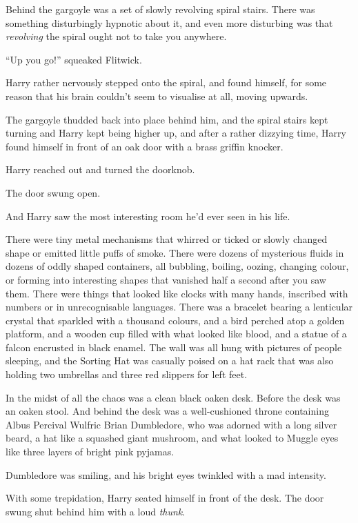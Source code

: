 Behind the gargoyle was a set of slowly revolving spiral stairs. There was something disturbingly hypnotic about it, and even more disturbing was that \emph{revolving} the spiral ought not to take you anywhere.

“Up you go!” squeaked Flitwick.

Harry rather nervously stepped onto the spiral, and found himself, for some reason that his brain couldn’t seem to visualise at all, moving upwards.

The gargoyle thudded back into place behind him, and the spiral stairs kept turning and Harry kept being higher up, and after a rather dizzying time, Harry found himself in front of an oak door with a brass griffin knocker.

Harry reached out and turned the doorknob.

The door swung open.

And Harry saw the most interesting room he’d ever seen in his life.

There were tiny metal mechanisms that whirred or ticked or slowly changed shape or emitted little puffs of smoke. There were dozens of mysterious fluids in dozens of oddly shaped containers, all bubbling, boiling, oozing, changing colour, or forming into interesting shapes that vanished half a second after you saw them. There were things that looked like clocks with many hands, inscribed with numbers or in unrecognisable languages. There was a bracelet bearing a lenticular crystal that sparkled with a thousand colours, and a bird perched atop a golden platform, and a wooden cup filled with what looked like blood, and a statue of a falcon encrusted in black enamel. The wall was all hung with pictures of people sleeping, and the Sorting Hat was casually poised on a hat rack that was also holding two umbrellas and three red slippers for left feet.

In the midst of all the chaos was a clean black oaken desk. Before the desk was an oaken stool. And behind the desk was a well-cushioned throne containing Albus Percival Wulfric Brian Dumbledore, who was adorned with a long silver beard, a hat like a squashed giant mushroom, and what looked to Muggle eyes like three layers of bright pink pyjamas.

Dumbledore was smiling, and his bright eyes twinkled with a mad intensity.

With some trepidation, Harry seated himself in front of the desk. The door swung shut behind him with a loud \emph{thunk}.

